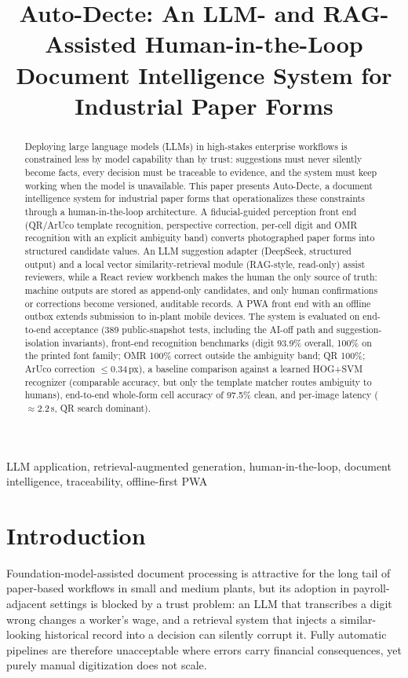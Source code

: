 \documentclass[conference]{IEEEtran}
\title{Auto-Decte: An LLM- and RAG-Assisted Human-in-the-Loop Document Intelligence System for Industrial Paper Forms}
\author{\IEEEauthorblockN{Anonymous Authors}
\IEEEauthorblockA{\textit{College of Computer Science and Electronic Engineering} \\
\textit{Hunan University}\\
Changsha, China \\
(anonymized for review)}}
\begin{document}
\maketitle

\begin{abstract}
Deploying large language models (LLMs) in high-stakes enterprise workflows is constrained less by model capability than by trust: suggestions must never silently become facts, every decision must be traceable to evidence, and the system must keep working when the model is unavailable. This paper presents Auto-Decte, a document intelligence system for industrial paper forms that operationalizes these constraints through a human-in-the-loop architecture. A fiducial-guided perception front end (QR/ArUco template recognition, perspective correction, per-cell digit and OMR recognition with an explicit ambiguity band) converts photographed paper forms into structured candidate values. An LLM suggestion adapter (DeepSeek, structured output) and a local vector similarity-retrieval module (RAG-style, read-only) assist reviewers, while a React review workbench makes the human the only source of truth: machine outputs are stored as append-only candidates, and only human confirmations or corrections become versioned, auditable records. A PWA front end with an offline outbox extends submission to in-plant mobile devices. The system is evaluated on end-to-end acceptance (389 public-snapshot tests, including the AI-off path and suggestion-isolation invariants), front-end recognition benchmarks (digit 93.9\% overall, 100\% on the printed font family; OMR 100\% correct outside the ambiguity band; QR 100\%; ArUco correction $\leq$0.34\,px), a baseline comparison against a learned HOG+SVM recognizer (comparable accuracy, but only the template matcher routes ambiguity to humans), end-to-end whole-form cell accuracy of 97.5\% clean, and per-image latency ($\approx$2.2\,s, QR search dominant).
\end{abstract}

\begin{IEEEkeywords}
LLM application, retrieval-augmented generation, human-in-the-loop, document intelligence, traceability, offline-first PWA
\end{IEEEkeywords}

\section{Introduction}
Foundation-model-assisted document processing is attractive for the long tail of paper-based workflows in small and medium plants, but its adoption in payroll-adjacent settings is blocked by a trust problem: an LLM that transcribes a digit wrong changes a worker's wage, and a retrieval system that injects a similar-looking historical record into a decision can silently corrupt it. Fully automatic pipelines are therefore unacceptable where errors carry financial consequences, yet purely manual digitization does not scale.
\end{document}

